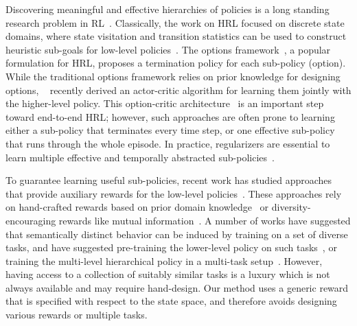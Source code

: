 \documentclass{article}
\begin{document}
Discovering meaningful and effective hierarchies of policies is a long standing research problem in RL~\cite{dayan1993feudal,parr1998reinforcement,sutton1999between,dietterich2000hierarchical,bacon2017option}. Classically, the work on HRL focused on discrete state domains, where state visitation and transition statistics can be used to construct heuristic sub-goals for low-level policies~\cite{stolle2002learning,mannor2004dynamic,chentanez2005intrinsically}. %
The options framework~\cite{sutton1999between,precup2000temporal}, a popular formulation for HRL, proposes a termination policy for each sub-policy (option). 
While the traditional options framework relies on prior knowledge for designing options,%
~\cite{bacon2017option} recently derived an actor-critic algorithm for learning them jointly with the higher-level policy. This option-critic architecture~\cite{bacon2017option} is an important step toward end-to-end HRL; however, such approaches are often prone to learning either a sub-policy that terminates every time step, or one effective sub-policy that runs through the whole episode. 
In practice, regularizers are essential to %
learn multiple effective and temporally abstracted 
sub-policies~\cite{bacon2017option,harb2017waiting,vezhnevets2016strategic}. %

To guarantee learning useful sub-policies, recent work has studied approaches that provide auxiliary rewards for the low-level policies~\cite{chentanez2005intrinsically,heess2016learning,kulkarni2016hierarchical,tessler2017deep,florensa2017stochastic}. These approaches rely on hand-crafted rewards based on prior domain knowledge~\cite{konidaris2007building,heess2016learning,kulkarni2016hierarchical,tessler2017deep} or  diversity-encouraging rewards like mutual information~\cite{daniel2012hierarchical,florensa2017stochastic}. 
A number of works have suggested that semantically distinct behavior can be induced by training on a set of diverse tasks, and have suggested pre-training the lower-level policy on such tasks~\cite{heess2016learning,florensa2017stochastic}, or training the multi-level hierarchical policy in a multi-task setup~\cite{frans2017meta,sigaud2018policy}.  However, having access to a collection of suitably similar tasks is a luxury which is not always available and may require hand-design.
Our method uses a generic reward that is specified with respect to the state space, and therefore avoids designing various rewards or multiple tasks.
\end{document}

